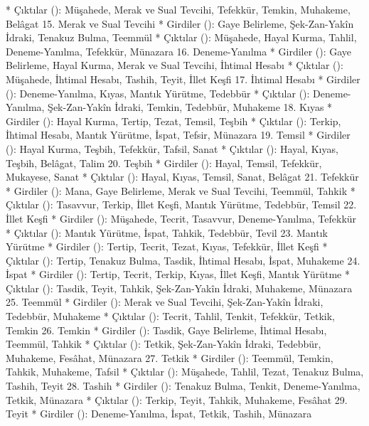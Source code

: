 \documentclass[11pt,a4paper]{article}
\begin{document}
 * Çıktılar (\rightarrow): Müşahede, Merak ve Sual Tevcihi, Tefekkür, Temkin, Muhakeme, Belâgat
15. Merak ve Sual Tevcihi
 * Girdiler (\leftarrow): Gaye Belirleme, Şek-Zan-Yakîn İdraki, Tenakuz Bulma, Teemmül
 * Çıktılar (\rightarrow): Müşahede, Hayal Kurma, Tahlil, Deneme-Yanılma, Tefekkür, Münazara
16. Deneme-Yanılma
 * Girdiler (\leftarrow): Gaye Belirleme, Hayal Kurma, Merak ve Sual Tevcihi, İhtimal Hesabı
 * Çıktılar (\rightarrow): Müşahede, İhtimal Hesabı, Tashih, Teyit, İllet Keşfi
17. İhtimal Hesabı
 * Girdiler (\leftarrow): Deneme-Yanılma, Kıyas, Mantık Yürütme, Tedebbür
 * Çıktılar (\rightarrow): Deneme-Yanılma, Şek-Zan-Yakîn İdraki, Temkin, Tedebbür, Muhakeme
18. Kıyas
 * Girdiler (\leftarrow): Hayal Kurma, Tertip, Tezat, Temsil, Teşbih
 * Çıktılar (\rightarrow): Terkip, İhtimal Hesabı, Mantık Yürütme, İspat, Tefsir, Münazara
19. Temsil
 * Girdiler (\leftarrow): Hayal Kurma, Teşbih, Tefekkür, Tafsil, Sanat
 * Çıktılar (\rightarrow): Hayal, Kıyas, Teşbih, Belâgat, Talim
20. Teşbih
 * Girdiler (\leftarrow): Hayal, Temsil, Tefekkür, Mukayese, Sanat
 * Çıktılar (\rightarrow): Hayal, Kıyas, Temsil, Sanat, Belâgat
21. Tefekkür
 * Girdiler (\leftarrow): Mana, Gaye Belirleme, Merak ve Sual Tevcihi, Teemmül, Tahkik
 * Çıktılar (\rightarrow): Tasavvur, Terkip, İllet Keşfi, Mantık Yürütme, Tedebbür, Temsil
22. İllet Keşfi
 * Girdiler (\leftarrow): Müşahede, Tecrit, Tasavvur, Deneme-Yanılma, Tefekkür
 * Çıktılar (\rightarrow): Mantık Yürütme, İspat, Tahkik, Tedebbür, Tevil
23. Mantık Yürütme
 * Girdiler (\leftarrow): Tertip, Tecrit, Tezat, Kıyas, Tefekkür, İllet Keşfi
 * Çıktılar (\rightarrow): Tertip, Tenakuz Bulma, Tasdik, İhtimal Hesabı, İspat, Muhakeme
24. İspat
 * Girdiler (\leftarrow): Tertip, Tecrit, Terkip, Kıyas, İllet Keşfi, Mantık Yürütme
 * Çıktılar (\rightarrow): Tasdik, Teyit, Tahkik, Şek-Zan-Yakîn İdraki, Muhakeme, Münazara
25. Teemmül
 * Girdiler (\leftarrow): Merak ve Sual Tevcihi, Şek-Zan-Yakîn İdraki, Tedebbür, Muhakeme
 * Çıktılar (\rightarrow): Tecrit, Tahlil, Tenkit, Tefekkür, Tetkik, Temkin
26. Temkin
 * Girdiler (\leftarrow): Tasdik, Gaye Belirleme, İhtimal Hesabı, Teemmül, Tahkik
 * Çıktılar (\rightarrow): Tetkik, Şek-Zan-Yakîn İdraki, Tedebbür, Muhakeme, Fesâhat, Münazara
27. Tetkik
 * Girdiler (\leftarrow): Teemmül, Temkin, Tahkik, Muhakeme, Tafsil
 * Çıktılar (\rightarrow): Müşahede, Tahlil, Tezat, Tenakuz Bulma, Tashih, Teyit
28. Tashih
 * Girdiler (\leftarrow): Tenakuz Bulma, Tenkit, Deneme-Yanılma, Tetkik, Münazara
 * Çıktılar (\rightarrow): Terkip, Teyit, Tahkik, Muhakeme, Fesâhat
29. Teyit
 * Girdiler (\leftarrow): Deneme-Yanılma, İspat, Tetkik, Tashih, Münazara
\end{document}
